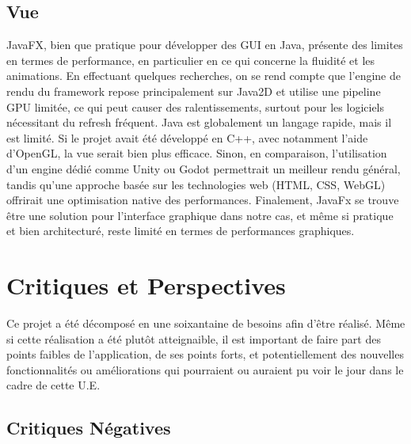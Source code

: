 \documentclass{article}
\begin{document}
\subsection{Vue}
JavaFX, bien que pratique pour développer des GUI en Java, présente des limites en termes de performance, en particulier en ce qui concerne
la fluidité et les animations. En effectuant quelques recherches, on se rend compte que l'engine de rendu du framework repose principalement
sur Java2D et utilise une pipeline GPU limitée, ce qui peut causer des ralentissements, surtout pour les logiciels nécessitant du refresh
fréquent. Java est globalement un langage rapide, mais il est limité. Si le projet avait été développé en C++, avec notamment
l'aide d'OpenGL, la vue serait bien plus efficace. Sinon, en comparaison, l'utilisation d'un engine dédié comme Unity ou Godot permettrait
un meilleur rendu général, tandis qu'une approche basée sur les technologies web (HTML, CSS, WebGL) offrirait une
optimisation native des performances. Finalement, JavaFx se trouve être une solution pour l'interface graphique dans notre cas, et même si
pratique et bien architecturé, reste limité en termes de performances graphiques.

\section{Critiques et Perspectives}
Ce projet a été décomposé en une soixantaine de besoins afin d'être réalisé. Même si cette réalisation a été plutôt atteignaible, il est important de
faire part des points faibles de l'application, de ses points forts, et potentiellement des nouvelles fonctionnalités ou améliorations qui pourraient ou 
auraient pu voir le jour dans le cadre de cette U.E.
\subsection{Critiques Négatives}
\end{document}
